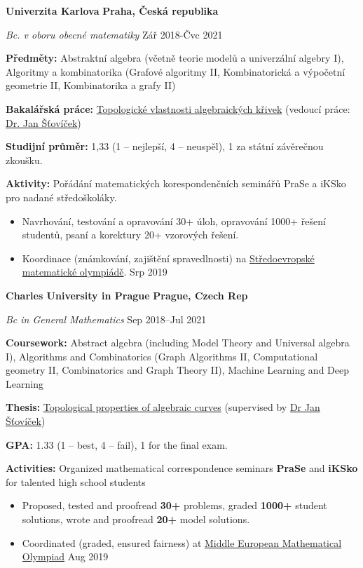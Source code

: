 \ifczech
\textbf{Univerzita Karlova} \hfill \textbf{Praha, Česká republika} \par
\textit{Bc. v oboru obecné matematiky} \hfill Zář 2018-Čvc 2021 \par
\textbf{Předměty:} Abstraktní algebra (včetně teorie modelů a univerzální algebry I), Algoritmy a kombinatorika (Grafové algoritmy II, Kombinatorická a výpočetní geometrie II, Kombinatorika a grafy II) \par
\textbf{Bakalářská práce:} \href{https://dspace.cuni.cz/handle/20.500.11956/128190}{Topologické vlastnosti algebraických křivek} (vedoucí práce: \href{https://scholar.google.com/scholar?hl=en&as_sdt=0\%2C5&q=jan+šťovíček&btnG=}{Dr. Jan Šťovíček}) \par
\textbf{Studijní průměr:} 1,33 (1 -- nejlepší, 4 -- neuspěl), 1 za státní závěrečnou zkoušku. \par
\textbf{Aktivity:} Pořádání matematických korespondenčních seminářů PraSe a iKSko pro nadané středoškoláky.
\begin{itemize}
\item Navrhování, testování a opravování 30+ úloh, opravování 1000+ řešení studentů, psaní a korektury 20+ vzorových řešení.
\item Koordinace (známkování, zajištění spravedlnosti) na \href{https://memo2019.karlin.mff.cuni.cz/#/staff}{Středoevropské matematické olympiádě}. \hfill Srp 2019
\end{itemize}

\else

\textbf{Charles University in Prague} \hfill \textbf{Prague, Czech Rep} \par
\textit{Bc in General Mathematics} \hfill Sep 2018--Jul 2021 \par
\textbf{Coursework:} Abstract algebra (including Model Theory and Universal algebra I), Algorithms and Combinatorics (Graph Algorithms II, Computational geometry II, Combinatorics and Graph Theory II), Machine Learning and Deep Learning \par
\textbf{Thesis:} \href{https://dspace.cuni.cz/handle/20.500.11956/128190}{Topological properties of algebraic curves} (supervised by \href{https://scholar.google.com/scholar?hl=en&as_sdt=0\%2C5&q=jan+šťovíček&btnG=}{Dr Jan Šťovíček}) \par
\textbf{GPA:} 1.33 (1 -- best, 4 -- fail), 1 for the final exam. \par
\textbf{Activities:} Organized mathematical correspondence seminars \textbf{PraSe} and \textbf{iKSko} for talented high school students
\begin{itemize}
    \item Proposed, tested and proofread \textbf{30+} problems, graded \textbf{1000+} student solutions, wrote and proofread \textbf{20+} model solutions.
    \item Coordinated (graded, ensured fairness) at \href{https://memo2019.karlin.mff.cuni.cz/#/staff}{Middle European Mathematical Olympiad} \hfill Aug 2019
\end{itemize}

\fi
